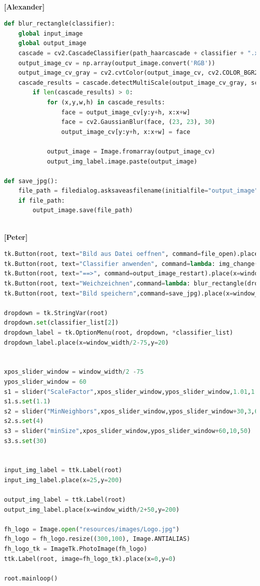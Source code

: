 \documentclass{article}
\begin{document}
\ \\ 
\textbf{[Alexander]}
\begin{lstlisting}[language=Python]
def blur_rectangle(classifier):
	global input_image
	global output_image
	cascade = cv2.CascadeClassifier(path_haarcascade + classifier + ".xml")
	output_image_cv = np.array(output_image.convert('RGB'))
	output_image_cv_gray = cv2.cvtColor(output_image_cv, cv2.COLOR_BGR2GRAY)
	cascade_results = cascade.detectMultiScale(output_image_cv_gray, scaleFactor=s1.get_val(), minNeighbors = s2.get_val(), minSize=(s3.get_val(), s3.get_val()))
		if len(cascade_results) > 0:
			for (x,y,w,h) in cascade_results:
				face = output_image_cv[y:y+h, x:x+w]
				face = cv2.GaussianBlur(face, (23, 23), 30)
				output_image_cv[y:y+h, x:x+w] = face

			output_image = Image.fromarray(output_image_cv)
			output_img_label.image.paste(output_image)

def save_jpg():
	file_path = filedialog.asksaveasfilename(initialfile="output_image", filetypes=(("jpg files", "*.jpg"),("png files", "*.png")), defaultextension=".jpeg")
	if file_path:
		output_image.save(file_path)
\end{lstlisting}
\ \\
\textbf{[Peter]}
\begin{lstlisting}[language=Python]
tk.Button(root, text="Bild aus Datei oeffnen", command=file_open).place(x=window_width/2-window_width/4,y=150)
tk.Button(root, text="Classifier anwenden", command=lambda: img_change(dropdown.get())).place(x=window_width/2+window_width/4,y=150)
tk.Button(root, text="==>", command=output_image_restart).place(x=window_width/2-12.5,y=window_height/2)
tk.Button(root, text="Weichzeichnen",command=lambda: blur_rectangle(dropdown.get())).place(x=window_width/2+window_width/4+122,y=150)
tk.Button(root, text="Bild speichern",command=save_jpg).place(x=window_width/2+window_width/4+220,y=150)

dropdown = tk.StringVar(root)
dropdown.set(classifier_list[2])
dropdown_label = tk.OptionMenu(root, dropdown, *classifier_list)
dropdown_label.place(x=window_width/2-75,y=20)


xpos_slider_window = window_width/2 -75
ypos_slider_window = 60
s1 = slider("ScaleFactor",xpos_slider_window,ypos_slider_window,1.01,1.5,float)
s1.s.set(1.1)
s2 = slider("MinNeighbors",xpos_slider_window,ypos_slider_window+30,3,6)
s2.s.set(4)
s3 = slider("minSize",xpos_slider_window,ypos_slider_window+60,10,50)
s3.s.set(30)


input_img_label = ttk.Label(root)
input_img_label.place(x=25,y=200)

output_img_label = ttk.Label(root)
output_img_label.place(x=window_width/2+50,y=200)

fh_logo = Image.open("resources/images/Logo.jpg")
fh_logo = fh_logo.resize((300,100), Image.ANTIALIAS)
fh_logo_tk = ImageTk.PhotoImage(fh_logo)
ttk.Label(root, image=fh_logo_tk).place(x=0,y=0)

root.mainloop()	
\end{lstlisting}



\newpage
 
\printbibliography
\end{document}
